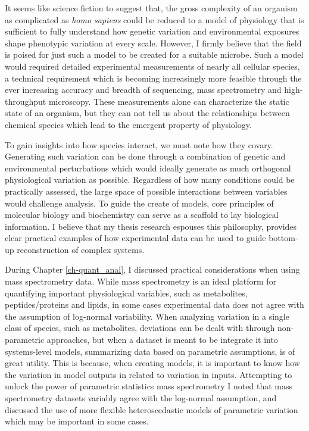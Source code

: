 It seems like science fiction to suggest that, the gross complexity of an organism as complicated as \textit{homo sapiens} could be reduced to a model of physiology that is sufficient to fully understand how genetic variation and environmental exposures shape phenotypic variation at every scale. However, I firmly believe that the field is poised for just such a model to be created for a suitable microbe. Such a model would required detailed experimental measurements of nearly all cellular species, a technical requirement which is becoming increasingly more feasible through the ever increasing accuracy and breadth of sequencing, mass spectrometry and high-throughput microscopy. These measurements alone can characterize the static state of an organism, but they can not tell us about the relationships between chemical species which lead to the emergent property of physiology. 

To gain insights into how species interact, we must note how they covary. Generating such variation can be done through a combination of genetic and environmental perturbations which would ideally generate as much orthogonal physiological variation as possible. Regardless of how many conditions could be practically assessed, the large space of possible interactions between variables would challenge analysis. To guide the create of models, core principles of molecular biology and biochemistry can serve as a scaffold to lay biological information. I believe that my thesis research espouses this philosophy, provides clear practical examples of how experimental data can be used to guide bottom-up reconstruction of complex systems.

During Chapter \ref{ch-quant_anal}, I discussed practical considerations when using mass spectrometry data.  While mass spectrometry is an ideal platform for quantifying important physiological variables, such as metabolites, peptides/proteins and lipids, in some cases experimental data does not agree with the assumption of log-normal variability. When analyzing variation in a single class of species, such as metabolites, deviations can be dealt with through non-parametric approaches, but when a dataset is meant to be integrate it into systems-level models, summarizing data based on parametric assumptions, is of great utility.  This is because, when creating models, it is important to know how the variation in model outputs in related to variation in inputs. Attempting to unlock the power of parametric statistics mass spectrometry I noted that mass spectrometry datasets variably agree with the log-normal assumption, and discussed the use of more flexible heteroscedastic models of parametric variation which may be important in some cases.

